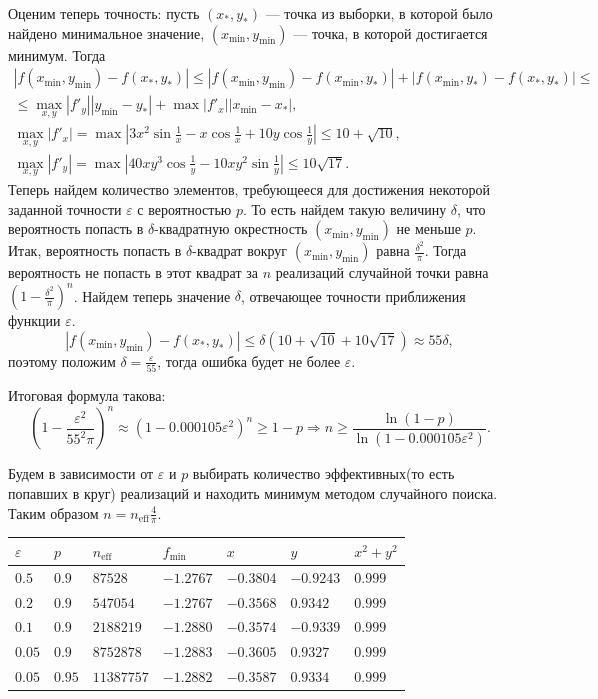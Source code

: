 \documentclass[12pt, a4paper]{article}
\begin{document}
Оценим теперь точность: пусть $\left(x_*,y_*\right)$ --- точка из выборки, в которой было найдено минимальное значение, $(x_{\min},y_{\min})$ --- точка, в которой достигается минимум. Тогда
\begin{gather*} \left| f(x_{\min} , y_{\min}) - f(x_*,y_*) \right| 
	\leqslant \left| 
	f\left(x_{\min},y_{\min}\right) - f\left(x_{\min},y_*\right)\right| + \left| f\left(x_{\min},y_*\right) - f\left(x_*,y_*\right)  \right| 
	\leqslant \\ \leqslant
	\max\limits_{x,y} \left|f'_{y}\right|\left| y_{\min}-y_*\right| + \max \left|f'_x\right|\left| x_{\min}-x_* \right|, \\
	\max\limits_{x,y} \left|f'_x\right| = \max \left| 3x^2\sin\frac1{x} - x\cos\frac1{x}+10y\cos\frac1y \right|  \leqslant 10 + \sqrt{10}, \\
	\max\limits_{x,y}\left|f'_y\right| = \max \left| 40xy^3\cos\frac1y -10xy^2\sin\frac1y \right| \leqslant 10\sqrt{17}. 
\end{gather*}
Теперь найдем количество элементов, требующееся для достижения некоторой заданной точности $\varepsilon$ с вероятностью $p$. То есть найдем такую величину $\delta$, что вероятность попасть в $\delta$-квадратную окрестность $(x_{\min},y_{\min})$ не меньше $p$.
Итак, вероятность попасть в $\delta$-квадрат вокруг $(x_{\min},y_{\min})$ равна $\frac{\delta^2}{\pi}$. Тогда вероятность не попасть в этот квадрат за $n$ реализаций случайной точки равна $\left(1-\frac{\delta^2}{\pi}\right)^n$. Найдем теперь значение $\delta$, отвечающее точности приближения функции $\varepsilon$.
\[\left| f(x_{\min} , y_{\min}) - f(x_*,y_*) \right| \leqslant \delta\left( 10 + \sqrt{10} + 10\sqrt{17}\right) \approx 55\delta,  \]
поэтому положим $\delta = \frac \varepsilon{55}$, тогда ошибка будет не более $\varepsilon$.

Итоговая формула такова: \[ \left(1-\frac{\varepsilon^2}{55^2\pi}\right)^n \approx \left( 1-0.000105\varepsilon^2 \right) ^n \geqslant 1-p \Rightarrow  n \geqslant \frac{\ln(1-p)}{\ln\left( 1-0.000105\varepsilon^2 \right) }.\] 

Будем в зависимости от $\varepsilon$ и $p$ выбирать количество эффективных(то есть попавших в круг) реализаций и находить минимум методом случайного поиска. Таким образом $n=n_{\text{eff} }\frac{4}{\pi}$.

\begin{tabular}{|l|l|l|l|l|l|l|}
\hline
$\varepsilon$ & $p$ & $n_{\text{eff} }$ & $f_{\min}$ &$x$& $y$ & $x^2+y^2$\\
\hline
$0.5$ & $0.9$ & $87528$ & $-1.2767$ & $-0.3804$ & $-0.9243$& $0.999$ \\
$0.2$ & $0.9$ & $547054$ & $-1.2767$ & $-0.3568$ & $0.9342$ & $0.999$\\
$0.1$ & $0.9$ & $2188219$ & $-1.2880$ & $-0.3574$ & $-0.9339$ & $0.999$\\
$0.05$ & $0.9$ & $8752878$ & $-1.2883$ & $-0.3605$ & $0.9327$ & $0.999$\\
$0.05$ & $0.95$ & $11387757$ & $-1.2882$ & $-0.3587$ & $0.9334$ & $0.999$\\
\hline
\end{tabular}
\end{document}
